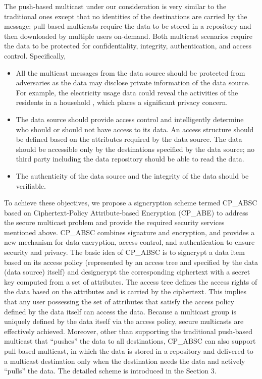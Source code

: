 \documentclass[letterpaper,12pt]{article}
\begin{document}
The push-based multicast under our consideration is very similar to the traditional ones except that no identities of the destinations are carried by the message; pull-based multicasts require the data to be stored in a repository and then downloaded by multiple users on-demand. Both multicast scenarios require the data to be protected for confidentiality, integrity, authentication, and access control. Specifically,
\begin{itemize}
\item All the multicast messages from the data source should be protected from adversaries as the data may disclose private information of the data source. For example, the electricity usage data could reveal the activities of the residents in a household \cite{Hart92}, which places a significant privacy concern.
\item The data source should provide access control and intelligently determine who should or should not have access to its data. An access structure should be defined based on the attributes required by the data source. The data should be accessible only by the destinations specified by the data source; no third party including the data repository should be able to read the data.
\item The authenticity of the data source and the integrity of the data should be verifiable.
\end{itemize}

To achieve these objectives, we propose a signcryption scheme termed CP\_ABSC based on Ciphertext-Policy Attribute-based Encryption (CP\_ABE) \cite{bethencourt2007ciphertext} to address the secure multicast problem and provide the required security services mentioned above. CP\_ABSC combines signature and encryption, and provides a new mechanism for data encryption, access control, and authentication to ensure security and privacy. The basic idea of CP\_ABSC is to signcrypt a data item based on its access policy (represented by an access tree and specified by the data (data source) itself) and designcrypt the corresponding ciphertext with a secret key computed from a set of attributes. The access tree defines the access rights of the data based on the attributes and is carried by the ciphertext. This implies that any user possessing the set of attributes that satisfy the access policy defined by the data itself can access the data. Because a multicast group is uniquely defined by the data itself via the access policy, secure multicasts are effectively achieved. Moreover, other than supporting the traditional push-based multicast that ``pushes'' the data to all destinations, CP\_ABSC can also support pull-based multicast, in which the data is stored in a repository and delivered to a multicast destination only when the destination needs the data and actively ``pulls'' the data. The detailed scheme is introduced in the Section 3.
\end{document}

